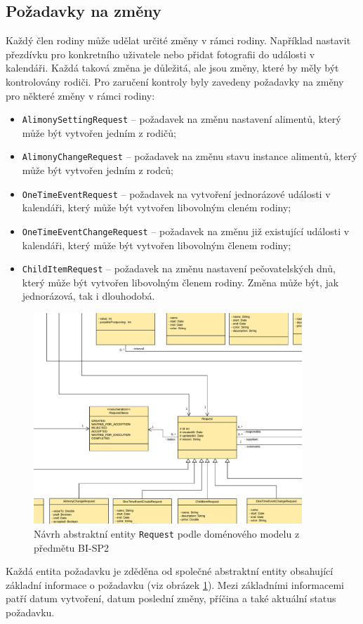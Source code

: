     \subsection{Požadavky na změny}
        Každý člen rodiny může udělat určité změny v rámci rodiny. Například nastavit přezdívku pro konkretního uživatele nebo přidat fotografii do události v kalendáři. Každá taková změna je důležitá, ale jsou změny, které by měly být kontrolovány rodiči. Pro zaručení kontroly byly zavedeny požadavky na změny pro některé změny v rámci rodiny:
        \begin{itemize}
            \item \texttt{AlimonySettingRequest} -- požadavek na změnu nastavení alimentů, který může být vytvořen jedním z rodičů;
            \item \texttt{AlimonyChangeRequest} -- požadavek na změnu stavu instance alimentů, který může být vytvořen jedním z rodců;
            \item \texttt{OneTimeEventRequest} -- požadavek na vytvoření jednorázové události v kalendáři, který může být vytvořen libovolným cleném rodiny;
            \item \texttt{OneTimeEventChangeRequest} -- požadavek na změnu již existující události v kalendáři, který může být vytvořen libovolným členem rodiny;
            \item \texttt{ChildItemRequest} -- požadavek na změnu nastavení pečovatelských dnů, který může být vytvořen libovolným členem rodiny. Změna může být, jak jednorázová, tak i dlouhodobá.
        \end{itemize}
        \begin{figure}\centering
	        \includegraphics[width=0.9\textwidth]{pdfs/Abstr-Requrest1}
	        \caption[Návrh abstraktní entity \texttt{Request}]{Návrh abstraktní entity \texttt{Request} podle doménového modelu z předmětu BI-SP2}\label{image:abstr-request1}
        \end{figure}
        Každá entita požadavku je zděděna od společné abstraktní entity obsahující základní informace o požadavku (viz obrázek \ref{image:abstr-request1}). Mezi základními informacemi patří datum vytvoření, datum poslední změny, příčina a také aktuální status požadavku.
        
